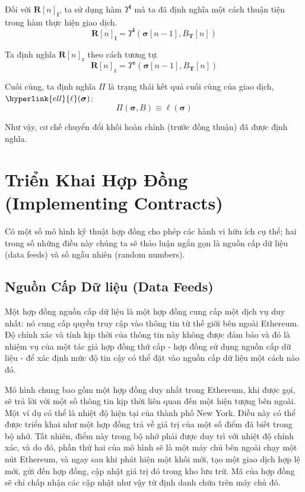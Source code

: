 \documentclass[9pt,oneside]{amsart}
\begin{document}
\begin{multicols}{2}
Đối với $\mathbf{R}[n]_{\mathbf{l}}$, ta sử dụng hàm \hyperlink{Upsilon_pow_l}{$\Upsilon^\mathbf{l}$} mà ta đã định nghĩa một cách thuận tiện trong hàm thực hiện giao dịch.
\begin{equation}
\mathbf{R}[n]_{\mathbf{l}} =
\Upsilon^{\mathbf{l}}(\boldsymbol{\sigma}[n - 1], B_{\mathbf{T}}[n])
\end{equation}

Ta định nghĩa \hyperlink{Upsilon_pow_z}{$\mathbf{R}[n]_{\mathrm{z}}$} theo cách tương tự.
\begin{equation}
\mathbf{R}[n]_{\mathrm{z}} =
\Upsilon^{\mathrm{z}}(\boldsymbol{\sigma}[n - 1], B_{\mathbf{T}}[n])
\end{equation}

\hypertarget{Pi}{}Cuối cùng, ta định nghĩa $\Pi$ là trạng thái kết quả cuối cùng của giao dịch, $\hyperlink{ell}{\ell}(\boldsymbol{\sigma})$:
\begin{equation}
\Pi(\boldsymbol{\sigma}, B) \equiv \ell(\boldsymbol{\sigma})
\end{equation}

Như vậy, cơ chế chuyển đổi khối hoàn chỉnh (trước đồng thuận) đã được định nghĩa.

\section{Triển Khai Hợp Đồng (Implementing Contracts)}

Có một số mô hình kỹ thuật hợp đồng cho phép các hành vi hữu ích cụ thể; hai trong số những điều này chúng ta sẽ thảo luận ngắn gọn là nguồn cấp dữ liệu (data feeds) và số ngẫu nhiên (random numbers).

\subsection{Nguồn Cấp Dữ liệu (Data Feeds)}
Một hợp đồng nguồn cấp dữ liệu là một hợp đồng cung cấp một dịch vụ duy nhất: nó cung cấp quyền truy cập vào thông tin từ thế giới bên ngoài Ethereum. Độ chính xác và tính kịp thời của thông tin này không được đảm bảo và đó là nhiệm vụ của một tác giả hợp đồng thứ cấp - hợp đồng sử dụng nguồn cấp dữ liệu - để xác định mức độ tin cậy có thể đặt vào nguồn cấp dữ liệu một cách nào đó.

Mô hình chung bao gồm một hợp đồng duy nhất trong Ethereum, khi được gọi, sẽ trả lời với một số thông tin kịp thời liên quan đến một hiện tượng bên ngoài. Một ví dụ có thể là nhiệt độ hiện tại của thành phố New York. Điều này có thể được triển khai như một hợp đồng trả về giá trị của một số điểm đã biết trong bộ nhớ. Tất nhiên, điểm này trong bộ nhớ phải được duy trì với nhiệt độ chính xác, và do đó, phần thứ hai của mô hình sẽ là một máy chủ bên ngoài chạy một nút Ethereum, và ngay sau khi phát hiện một khối mới, tạo một giao dịch hợp lệ mới, gửi đến hợp đồng, cập nhật giá trị đó trong kho lưu trữ. Mã của hợp đồng sẽ chỉ chấp nhận các cập nhật như vậy từ định danh chứa trên máy chủ đó.


\end{multicols}
\end{document}
